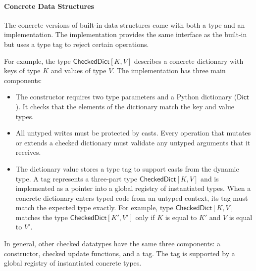 \documentclass[english,cleveref,submission]{programming}
\newcommand{\typefont}[1]{\mathsf{#1}}
\newcommand{\paramtype}[2]{#1[#2]}
\newcommand{\sptrawpydict}{\typefont{Dict}}
\newcommand{\sptrawchkdict}{\typefont{CheckedDict}} %
\newcommand{\sptchkdict}[2]{\paramtype{\sptrawchkdict}{#1, #2}}
\begin{document}


\paragraph{Concrete Data Structures}
\label{s:chkdict-impl}

The concrete versions of built-in data structures come with both a type and an
implementation.
The implementation provides the same interface as the built-in but uses a
type tag to reject certain operations.

For example, the type $\sptchkdict{K}{V}$ describes a concrete dictionary
with keys of type $K$ and values of type $V$.
The implementation has three main components:
\begin{itemize}
  \item
    The constructor requires two type parameters and a Python dictionary ($\sptrawpydict$).
    It checks that the elements of the dictionary match the key and value types.
  \item
    All untyped writes must be protected by casts.
    Every operation that mutates or extends a checked dictionary must
    validate any untyped arguments that it receives.
  \item
    The dictionary value stores a type tag to support casts from the dynamic
    type.
    A tag represents a three-part type $\sptchkdict{K}{V}$ and is implemented
    as a pointer into a global registry of instantiated types.
    When a concrete dictionary enters typed code from an untyped context,
    its tag must match the expected type exactly.
    For example, type $\sptchkdict{K}{V}$ matches the type
    $\sptchkdict{K'}{V'}$ only if $K$ is equal to $K'$
    and $V$ is equal to $V'$.
\end{itemize}
%
In general, other checked datatypes have the same three components:
a constructor, checked update functions, and a tag.
The tag is supported by a global registry of instantiated concrete types.
\end{document}
